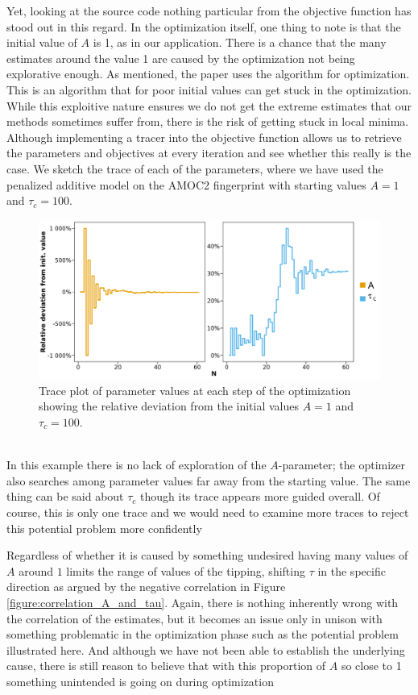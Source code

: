 Yet, looking at the source code nothing particular from the objective function has stood out in this regard. In the optimization itself, one thing to note is that the initial value of $A$ is 1, as in our application. There is a chance that the many estimates around the value 1 are caused by the optimization not being explorative enough. As mentioned, the paper uses the  algorithm for optimization. This is an algorithm that for poor initial values can get stuck in the optimization. While this exploitive nature ensures we do not get the extreme estimates that our methods sometimes suffer from, there is the risk of getting stuck in local minima. Although implementing a tracer into the objective function allows us to retrieve the parameters and objectives at every iteration and see whether this really is the case. We sketch the trace of each of the parameters, where we have used the penalized additive model on the AMOC2 fingerprint with starting values $A = 1$ and $\tau_c = 100$. 
\begin{figure}[h!]
\begin{center}
    \includegraphics[scale = .075]{figures/trace_plot.jpeg}
    \caption{Trace plot of parameter values at each step of the optimization showing the relative deviation from the initial values $A = 1$ and $\tau_c = 100$.}
    \label{figure:trace_plot}
\end{center}
\end{figure}\\
In this example there is no lack of exploration of the $A$-parameter; the optimizer also searches among parameter values far away from the starting value. The same thing can be said about $\tau_c$ though its trace appears more guided overall. Of course, this is only one trace and we would need to examine more traces to reject this potential problem more confidently

Regardless of whether it is caused by something undesired having many values of $A$ around $1$ limits the range of values of the tipping, shifting $\tau$ in the specific direction as argued by the negative correlation in Figure \ref{figure:correlation_A_and_tau}. Again, there is nothing inherently wrong with the correlation of the estimates, but it becomes an issue only in unison with something problematic in the optimization phase such as the potential problem illustrated here. And although we have not been able to establish the underlying cause, there is still reason to believe that with this proportion of $A$ so close to 1 something unintended is going on during optimization

